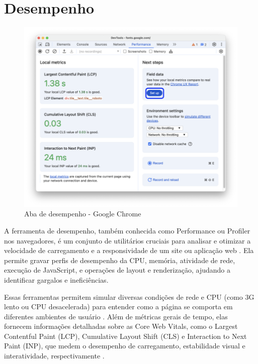 \section{Desempenho}
\begin{figure}[h!]
    \centering
    \includegraphics[width=0.7\linewidth]{assets/tools/chrome-performance.png}
    \caption{Aba de desempenho - Google Chrome }
    \label{fig:enter-label}
\end{figure}
A ferramenta de desempenho, também conhecida como Performance ou Profiler nos navegadores, é um conjunto de utilitários cruciais para analisar e otimizar a velocidade de carregamento e a responsividade de um site ou aplicação web . Ela permite gravar perfis de desempenho da CPU, memória, atividade de rede, execução de JavaScript, e operações de layout e renderização, ajudando a identificar gargalos e ineficiências\cite{chrome}.

Essas ferramentas permitem simular diversas condições de rede e CPU (como 3G lento ou CPU desacelerada) para entender como a página se comporta em diferentes ambientes de usuário . Além de métricas gerais de tempo, elas fornecem informações detalhadas sobre as Core Web Vitals, como o Largest Contentful Paint (LCP), Cumulative Layout Shift (CLS) e Interaction to Next Paint (INP), que medem o desempenho de carregamento, estabilidade visual e interatividade, respectivamente \cite{chrome}. 
\newpage
